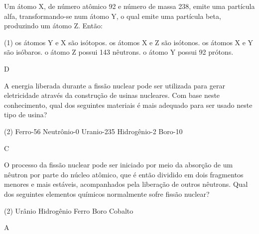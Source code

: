 \documentclass[9 pt]{scrartcl}
\def\PQ{0.84} %
\begin{document}
\begin{exercise}[points=\PQ]
Um átomo X, de número atômico 92 e número de massa 238, emite uma partícula alfa, transformando-se num átomo Y, o qual emite uma partícula beta, produzindo um átomo Z. Então:

\begin{choice}(1)
\choice os átomos Y e X são isótopos.
\choice os átomos X e Z são isótonos.
\choice os átomos X e Y são isóbaros.
\choice o átomo Z possui 143 nêutrons.
\choice o átomo Y possui 92 prótons.
\end{choice}
\end{exercise}
\begin{solution}
D
\end{solution}



\begin{exercise}[points=\PQ]
A energia liberada durante a fissão nuclear pode ser utilizada para gerar eletricidade através da construção de usinas nucleares. Com base neste conhecimento, qual dos seguintes materiais é mais adequado para ser usado neste tipo de usina?


\begin{choice}(2)
\choice Ferro-56
\choice Neutrônio-0
\choice Uranio-235
\choice Hidrogênio-2
\choice Boro-10
\end{choice}
\end{exercise}
\begin{solution}
C
\end{solution}




\begin{exercise}[points=\PQ]
O processo da fissão nuclear pode ser iniciado por meio da absorção de um nêutron por parte do núcleo atômico, que é então dividido em dois fragmentos menores e mais estáveis, acompanhados pela liberação de outros nêutrons. Qual dos seguintes elementos químicos normalmente sofre fissão nuclear?

\begin{choice}(2)
\choice Urânio
\choice Hidrogênio
\choice Ferro
\choice Boro
\choice Cobalto
\end{choice}
\end{exercise}
\begin{solution}
A
\end{solution}
\end{document}
